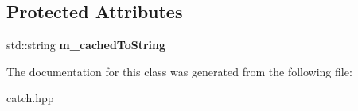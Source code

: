 \subsection*{Protected Attributes}
\begin{DoxyCompactItemize}
\item 
\mbox{\label{classCatch_1_1Matchers_1_1Impl_1_1MatcherUntypedBase_a951095c462657e7097a9a6dc4dde813f}} 
std\+::string {\bfseries m\+\_\+cached\+To\+String}
\end{DoxyCompactItemize}


The documentation for this class was generated from the following file\+:\begin{DoxyCompactItemize}
\item 
catch.\+hpp\end{DoxyCompactItemize}
